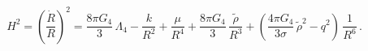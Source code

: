 \begin{equation}
H^2=\left(\frac{\dot R}{R}\right)^2=\frac{8\pi G_4}{3}\,\Lambda_4-
\frac{k}{R^2}+ \frac{\mu}{R^4} + \frac{8\pi G_4}{3}\,\frac{\tilde{\rho}}{R^3}
+\left(\frac{4\pi G_4}{3\sigma}\,\tilde{\rho}^2-q^2\right)\,\frac{1}{R^6}\,.
\end{equation}

